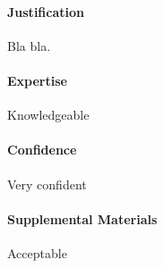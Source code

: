 \paragraph{Justification}
Bla bla.

\paragraph{Expertise}
Knowledgeable

\paragraph{Confidence}
Very confident

\paragraph{Supplemental Materials}
Acceptable
